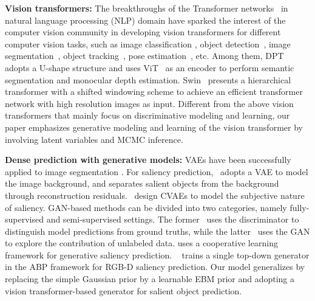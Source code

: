 \documentclass{article}
\begin{document}
\noindent\textbf{Vision transformers:}
The breakthroughs of the Transformer networks~\cite{transformer_nips} in natural language processing (NLP) domain have sparked the interest of the computer vision community in developing vision transformers for different computer vision tasks, such as image classification \cite{dosovitskiy_ViT_ICLR_2021,liu2021swin}, object detection~\cite{carion_DETR_ECCV_2020, wang_PVT_2021,mvt_multi_view_transformer,liu2021swin}, image segmentation~\cite{zheng_SETR_2020, dpt_transformer, wang_PVT_2021, liu2021swin}, object tracking~\cite{xu_TransCenterTracking_2021, yan_SpatialTemporalTransformerTrackingv2_2021}, pose estimation~\cite{mao_TFPose_2021,stoffl_InstancePose_2021}, etc.
Among them, DPT~\cite{dpt_transformer} adopts a U-shape structure and uses ViT~\cite{dosovitskiy_ViT_ICLR_2021} as an encoder to perform semantic segmentation and monocular depth estimation.
Swin~\cite{liu2021swin} presents a hierarchical transformer with a shifted windowing scheme to achieve an efficient transformer network with high resolution images as input. Different from the above vision transformers that mainly focus on discriminative modeling and learning, our paper emphasizes generative modeling  and learning of the vision transformer by involving latent variables and MCMC inference.


\noindent\textbf{Dense prediction with generative models:}
VAEs have been successfully applied to image segmentation \cite{PHiSeg2019, probabilistic_unet}. For saliency prediction,~\cite{SuperVAE_AAAI19} adopts a VAE to model the image background, and separates salient objects from the background through reconstruction residuals.~\cite{ucnet_sal,jing2020uncertainty} design CVAEs to model the subjective nature of saliency. GAN-based methods can be divided into two categories, namely fully-supervised and semi-supervised settings. The former~\cite{groenendijk2020benefit,gan_maskerrcnn} uses the discriminator to distinguish model predictions from ground truths, while the latter~\cite{gan_semi_seg,hung2018adversarial} uses the GAN to explore the contribution of unlabeled data. \cite{zhang2021energy} uses a cooperative learning framework \cite{xie2018cooperative,xie2021cooperative} for generative saliency prediction. ~\cite{jing2020uncertainty} trains a single top-down generator in the ABP framework for RGB-D saliency prediction. Our model generalizes \cite{jing2020uncertainty} by replacing the simple Gaussian prior by a learnable EBM prior and adopting a vision transformer-based generator for salient object prediction. 
\end{document}
